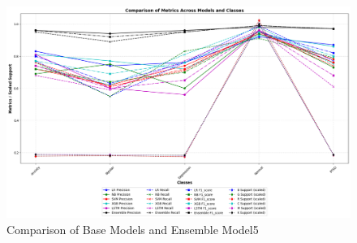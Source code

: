 \begin{figure}[h!]  
    \centering
    \includegraphics[width=1.0\textwidth]{Images/BLD RESULT.png}  
    \caption{Comparison of Base Models and Ensemble Model5}
    \label{lstm arch}  %
\end{figure}


